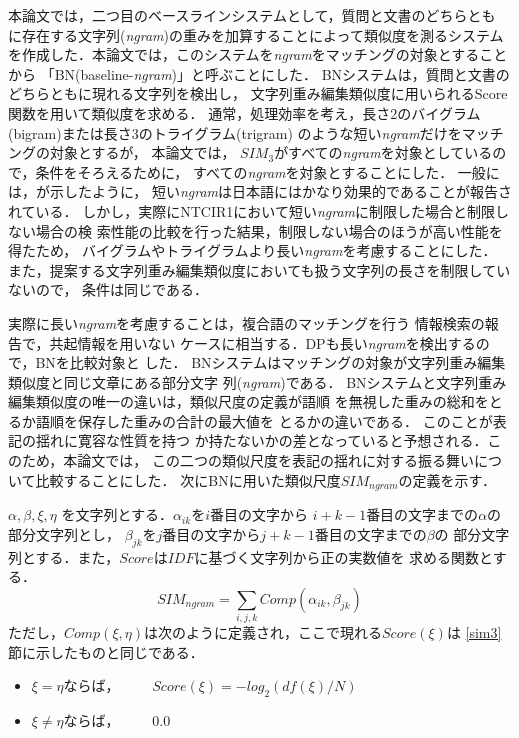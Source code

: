 本論文では，二つ目のベースラインシステムとして，質問と文書のどちらとも
に存在する文字列({\it ngram})の重みを加算することによって類似度を測るシステム
を作成した．本論文では，このシステムを{\it ngram}をマッチングの対象とすることから
「BN(baseline-{\it ngram})」と呼ぶことにした．
BNシステムは，質問と文書のどちらともに現れる文字列を検出し，
文字列重み編集類似度に用いられるScore関数を用いて類似度を求める．
通常，処理効率を考え，長さ2のバイグラム(bigram)または長さ3のトライグラム(trigram)
のような短い{\it ngram}だけをマッチングの対象とするが，
本論文では，
$SIM_3$がすべての{\it ngram}を対象としているので，条件をそろえるために，
すべての{\it ngram}を対象とすることにした．
一般には，\cite{Fujii93}が示したように，
短い{\it ngram}は日本語にはかなり効果的であることが報告されている．
しかし，実際にNTCIR1において短い{\it ngram}に制限した場合と制限しない場合の検
索性能の比較を行った結果，制限しない場合のほうが高い性能を得たため，
バイグラムやトライグラムより長い{\it ngram}を考慮することにした．
また，提案する文字列重み編集類似度においても扱う文字列の長さを制限していないので，
条件は同じである．

実際に長い{\it ngram}を考慮することは，複合語のマッチングを行う
情報検索\cite{Yamada97}の報告で，共起情報を用いない
ケースに相当する．DPも長い{\it ngram}を検出するので，BNを比較対象と
した．
BNシステムはマッチングの対象が文字列重み編集類似度と同じ文章にある部分文字
列({\it ngram})である．
BNシステムと文字列重み編集類似度の唯一の違いは，類似尺度の定義が語順
を無視した重みの総和をとるか語順を保存した重みの合計の最大値を
とるかの違いである．
このことが表記の揺れに寛容な性質を持つ
か持たないかの差となっていると予想される．このため，本論文では，
この二つの類似尺度を表記の揺れに対する振る舞いについて比較することにした．
次にBNに用いた類似尺度$SIM_{ngram}$の定義を示す．
\begin{df}
$\alpha,\beta,\xi,\eta$ を文字列とする．$\alpha_{ik}$を$i$番目の文字から
$i+k-1$番目の文字までの$\alpha$の部分文字列とし，
$\beta_{jk}$を$j$番目の文字から$j+k-1$番目の文字までの$\beta$の
部分文字列とする．また，$Score$は$IDF$に基づく文字列から正の実数値を
求める関数とする．
\[SIM_{ngram} = \sum_{i,j,k} Comp(\alpha_{ik},\beta_{jk})\]
ただし，$Comp(\xi,\eta)$は次のように定義され，ここで現れる$Score(\xi)$は
\ref{sim3}節に示したものと同じである．
\begin{itemize} 
\item $\xi = \eta$ならば，~~~~ $Score(\xi) = - log_2(df(\xi)/N)$
\item $\xi \neq \eta$ならば，~~~~ $0.0$ 
\end{itemize} 
\end{df}

